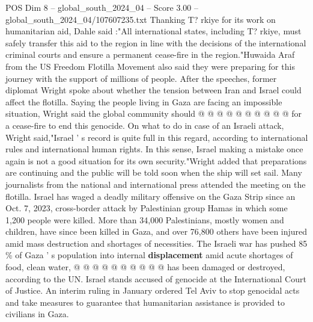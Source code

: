 \begin{textsample}{POS Dim 8 – global\_south\_2024\_04 – Score 3.00 – global\_south\_2024\_04/107607235.txt}
Thanking T? rkiye for its work on humanitarian aid, Dahle said :"All international states, including T? rkiye, must safely transfer this aid to the region in line with the decisions of the international criminal courts and ensure a permanent cease-fire in the region."Huwaida Araf from the US Freedom Flotilla Movement also said they were preparing for this journey with the support of millions of people.
After the speeches, former diplomat Wright spoke about whether the tension between Iran and Israel could affect the flotilla.
Saying the people living in Gaza are facing an impossible situation, Wright said the global community should @ @ @ @ @ @ @ @ @ @ for a cease-fire to end this genocide.
On what to do in case of an Israeli attack, Wright said,"Israel ' s record is quite full in this regard, according to international rules and international human rights.
In this sense, Israel making a mistake once again is not a good situation for its own security."Wright added that preparations are continuing and the public will be told soon when the ship will set sail.
Many journalists from the national and international press attended the meeting on the flotilla.
Israel has waged a deadly military offensive on the Gaza Strip since an Oct. 7, 2023, cross-border attack by Palestinian group Hamas in which some 1,200 people were killed.
More than 34,000 Palestinians, mostly women and children, have since been killed in Gaza, and over 76,800 others have been injured amid mass destruction and shortages of necessities.
The Israeli war has pushed 85 \% of Gaza ' s population into internal \textbf{displacement} amid acute shortages of food, clean water, @ @ @ @ @ @ @ @ @ @ has been damaged or destroyed, according to the UN.
Israel stands accused of genocide at the International Court of Justice.
An interim ruling in January ordered Tel Aviv to stop genocidal acts and take measures to guarantee that humanitarian assistance is provided to civilians in Gaza.

\end{textsample}
